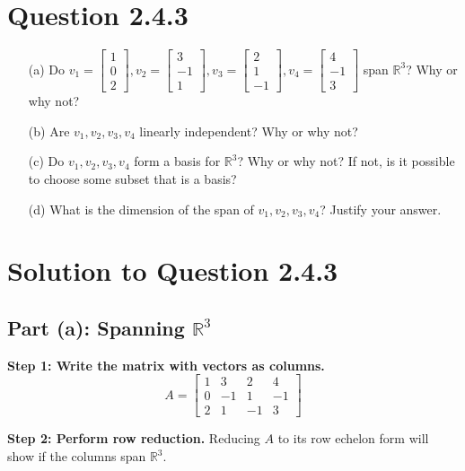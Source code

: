 \documentclass[12pt]{article}
\begin{document}
\newpage
\section*{Question 2.4.3}
\begin{itemize}
    \item[(a)] Do \( v_1 = \begin{bmatrix} 1 \\ 0 \\ 2 \end{bmatrix}, v_2 = \begin{bmatrix} 3 \\ -1 \\ 1 \end{bmatrix}, v_3 = \begin{bmatrix} 2 \\ 1 \\ -1 \end{bmatrix}, v_4 = \begin{bmatrix} 4 \\ -1 \\ 3 \end{bmatrix} \) span \( \mathbb{R}^3 \)? Why or why not?
    \item[(b)] Are \( v_1, v_2, v_3, v_4 \) linearly independent? Why or why not?
    \item[(c)] Do \( v_1, v_2, v_3, v_4 \) form a basis for \( \mathbb{R}^3 \)? Why or why not? If not, is it possible to choose some subset that is a basis?
    \item[(d)] What is the dimension of the span of \( v_1, v_2, v_3, v_4 \)? Justify your answer.
\end{itemize}

\section*{Solution to Question 2.4.3}

\subsection*{Part (a): Spanning \( \mathbb{R}^3 \)}
\textbf{Step 1: Write the matrix with vectors as columns.}
\[
A = \begin{bmatrix}
1 & 3 & 2 & 4 \\
0 & -1 & 1 & -1 \\
2 & 1 & -1 & 3
\end{bmatrix}
\]

\textbf{Step 2: Perform row reduction.}
Reducing \(A\) to its row echelon form will show if the columns span \( \mathbb{R}^3 \).
\end{document}
